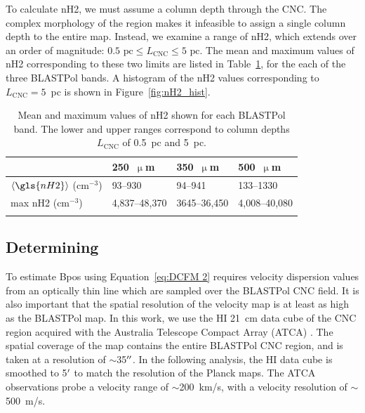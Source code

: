 To calculate \gls{nH2}, we must assume a column depth through the CNC\@. The complex morphology of the region makes it infeasible to assign a single column depth to the entire map. Instead, we examine a range of \gls{nH2}, which extends over an order of magnitude: $0.5 \text{~pc} \leq L_{\mathrm{CNC}} \leq 5 \text{~pc}$. The mean and maximum values of \gls{nH2} corresponding to these two limits are listed in Table~\ref{table:nH2}, for the each of the three BLASTPol bands. A histogram of the \gls{nH2} values corresponding to $L_{\mathrm{CNC}} = 5$~pc is shown in Figure~\ref{fig:nH2_hist}.

\begin{table}[hbtp]
  \centering
\begin{tabular}{@{}llll@{}}
\dtoprule{}
                            & 250~$\upmu$m     & 350~$\upmu$m     & 500~$\upmu$m     \\ \midrule
$\langle \gls{nH2} \rangle$ ($\mathrm{cm}^{-3}$) & 93--930      & 94--941      & 133--1330    \\
max \gls{nH2} ($\mathrm{cm}^{-3}$)             & 4,837--48,370 & 3645--36,450 & 4,008--40,080
\\ \dbottomrule{}
\\
\end{tabular}
\centering
\caption[~Mean and maximum values of  shown for each BLASTPol band.]{Mean and maximum values of \gls{nH2} shown for each BLASTPol band. The lower and upper ranges correspond to column depths $L_{\mathrm{CNC}}$ of 0.5~pc and 5~pc.}
\label{table:nH2}
\end{table}

\subsection{Determining }\label{sigV}

To estimate \gls{Bpos} using Equation~\ref{eq:DCFM 2} requires velocity dispersion values from an optically thin line which are sampled over the BLASTPol CNC field. It is also important that the spatial resolution of the velocity map is at least as high as the BLASTPol map. In this work, we use the $\mathrm{HI}$ 21~cm data cube of the CNC region acquired with the Australia Telescope Compact Array (ATCA) \citep{rebolledo2017carina}. The spatial coverage of the map contains the entire BLASTPol CNC region, and is taken at a resolution of $\sim$35$\operatorname{^{\prime\prime}}$. In the following analysis, the $\mathrm{HI}$ data cube is smoothed to 5$\operatorname{^{\prime}}$ to match the resolution of the Planck maps. The ATCA observations probe a velocity range of $\sim$200~km/s, with a velocity resolution of $\sim$500~m/s.


